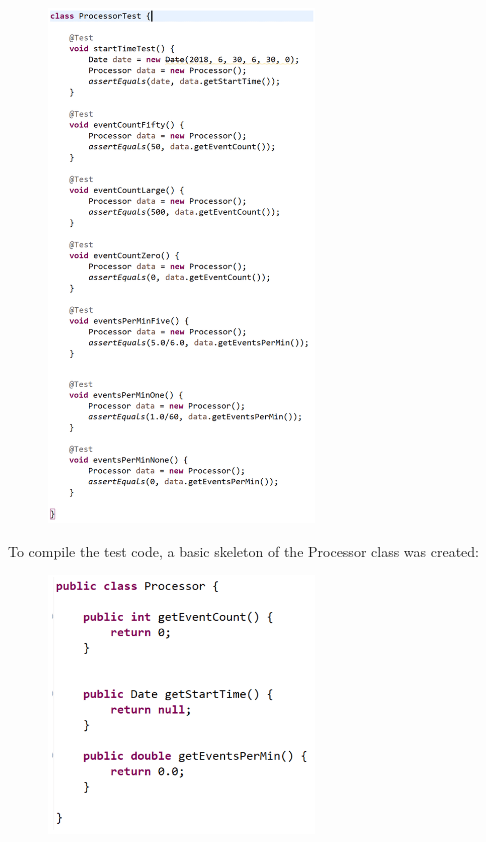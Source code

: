 \documentclass[11pt,a4paper]{article}
\begin{document}
\begin{figure}[h]
      \includegraphics[width=0.63\textwidth]{codeimg1.png}  
\end{figure}

To compile the test code, a basic skeleton of the Processor class was created:

\begin{figure}[h]
	\includegraphics[width=0.63\textwidth]{codeimg2.png}
\end{figure}
\end{document}
